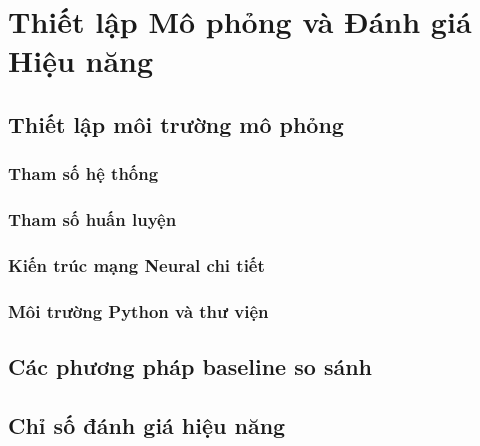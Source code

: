 \chapter{Thiết lập Mô phỏng và Đánh giá Hiệu năng}
\label{chap:simulation}

\section{Thiết lập môi trường mô phỏng}
\label{sec:sim:setup}

\subsection{Tham số hệ thống}
\label{subsec:sim:params}

\subsection{Tham số huấn luyện}
\label{subsec:sim:training-params}

\subsection{Kiến trúc mạng Neural chi tiết}
\label{subsec:sim:nn-arch}

\subsection{Môi trường Python và thư viện}
\label{subsec:sim:env}

\section{Các phương pháp baseline so sánh}
\label{sec:sim:baselines}

\section{Chỉ số đánh giá hiệu năng}
\label{sec:sim:metrics}

